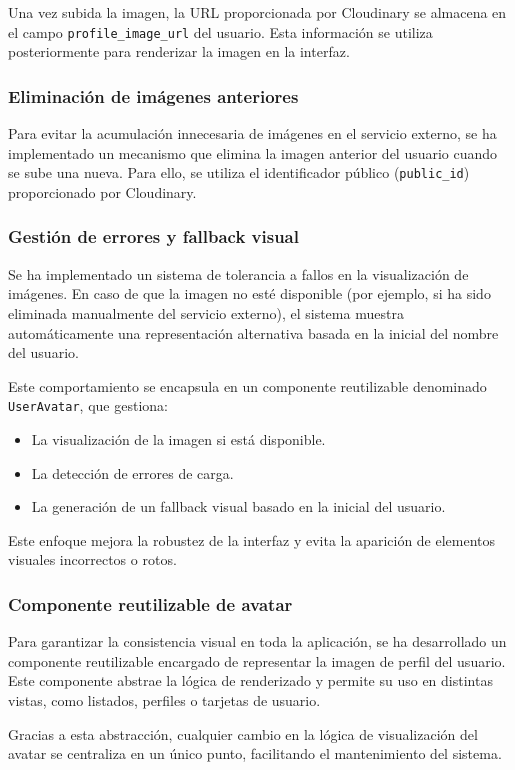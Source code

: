 Una vez subida la imagen, la URL proporcionada por Cloudinary se almacena en el campo \texttt{profile\_image\_url} del usuario. Esta información se utiliza posteriormente para renderizar la imagen en la interfaz.

\subsubsection{Eliminación de imágenes anteriores}

Para evitar la acumulación innecesaria de imágenes en el servicio externo, se ha implementado un mecanismo que elimina la imagen anterior del usuario cuando se sube una nueva. Para ello, se utiliza el identificador público (\texttt{public\_id}) proporcionado por Cloudinary.

\subsubsection{Gestión de errores y fallback visual}

Se ha implementado un sistema de tolerancia a fallos en la visualización de imágenes. En caso de que la imagen no esté disponible (por ejemplo, si ha sido eliminada manualmente del servicio externo), el sistema muestra automáticamente una representación alternativa basada en la inicial del nombre del usuario.

Este comportamiento se encapsula en un componente reutilizable denominado \texttt{UserAvatar}, que gestiona:

\begin{itemize}
    \item La visualización de la imagen si está disponible.
    \item La detección de errores de carga.
    \item La generación de un fallback visual basado en la inicial del usuario.
\end{itemize}

Este enfoque mejora la robustez de la interfaz y evita la aparición de elementos visuales incorrectos o rotos.

\subsubsection{Componente reutilizable de avatar}

Para garantizar la consistencia visual en toda la aplicación, se ha desarrollado un componente reutilizable encargado de representar la imagen de perfil del usuario. Este componente abstrae la lógica de renderizado y permite su uso en distintas vistas, como listados, perfiles o tarjetas de usuario.

Gracias a esta abstracción, cualquier cambio en la lógica de visualización del avatar se centraliza en un único punto, facilitando el mantenimiento del sistema.